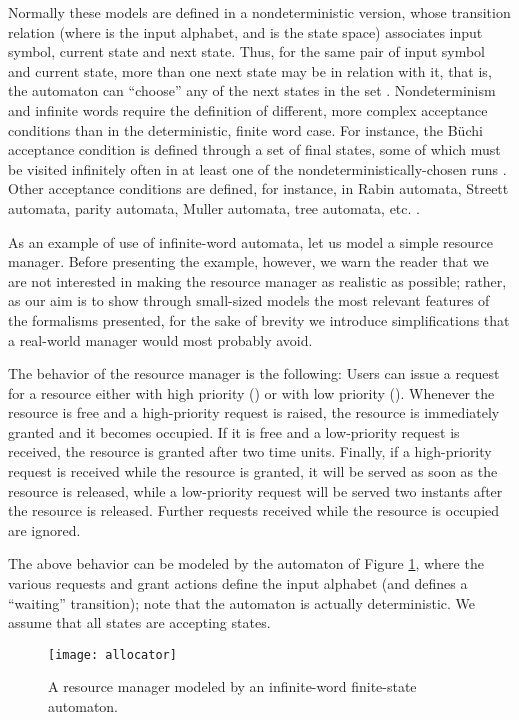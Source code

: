Normally these models are defined in a nondeterministic version, 
whose transition relation 
(where  is the input alphabet, and  is the state space) associates
input symbol, current state and next state. 
Thus, for the same pair  of input symbol and current state,
more than one next state  may be in relation with it, that is, the automaton can ``choose'' 
any of the next states in the set .
Nondeterminism and infinite words require the definition of different, 
more complex acceptance conditions than in the deterministic, 
finite word case. For instance, the B\"uchi acceptance condition 
is defined through a set of final states, some of which must 
be visited infinitely often in at least one of the nondeterministically-chosen 
runs \cite{Var96}. Other acceptance conditions are defined, for instance, 
in Rabin automata, Streett automata, parity automata, Muller 
automata, tree automata, etc. \cite{Tho90}.

As an example of use of infinite-word automata, let us model 
a simple resource manager. Before presenting the example, however, 
we warn the reader that we are not interested in making the resource 
manager as realistic as possible; rather, as our aim is to show 
through small-sized models the most relevant features of the 
formalisms presented, for the sake of brevity we introduce simplifications 
that a real-world manager would most probably avoid.

The behavior of the resource manager is the following: Users 
can issue a request for a resource either with high priority 
() or with low priority (). Whenever the resource 
is free and a high-priority request is raised, the resource is 
immediately granted and it becomes occupied. If it is free and 
a low-priority request is received, the resource is granted after 
two time units. Finally, if a high-priority request is received 
while the resource is granted, it will be served as soon as the 
resource is released, while a low-priority request will be served 
two instants after the resource is released. Further requests 
received while the resource is occupied are ignored.

The above behavior can be modeled by the automaton of Figure \ref{fig:allocator}, 
where the various requests and grant actions define the input 
alphabet (and  defines a ``waiting'' transition); note 
that the automaton is actually deterministic. We assume that 
all states are accepting states.
\begin{figure}[htb!]
	 \centering
	 \texttt{[image: allocator]}
	 \caption{A resource manager modeled by an infinite-word finite-state automaton.}
	 \label{fig:allocator}
\end{figure}

